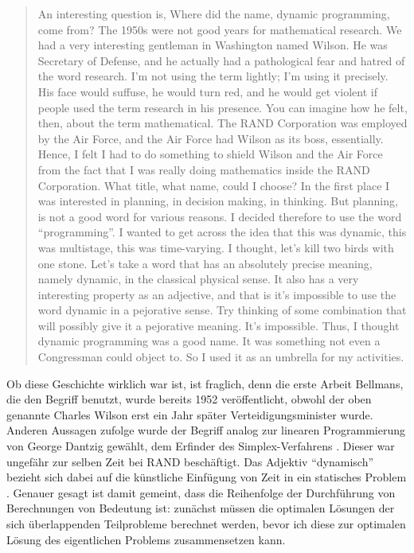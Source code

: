 \begin{quotation}
	An interesting question is, Where did the name, dynamic programming, come from? The 1950s were not good years for mathematical research. We had a very interesting gentleman in Washington named Wilson. He was Secretary of Defense, and he actually had a pathological fear and hatred of the word research. I’m not using the term lightly; I’m using it precisely. His face would suffuse, he would turn red, and he would get violent if people used the term research in his presence. You can imagine how he felt, then, about the term mathematical. The RAND Corporation was employed by the Air Force, and the Air Force had Wilson as its boss, essentially. Hence, I felt I had to do something to shield Wilson and the Air Force from the fact that I was really doing mathematics inside the RAND Corporation. What title, what name, could I choose? In the first place I was interested in planning, in decision making, in thinking. But planning, is not a good word for various reasons. I decided therefore to use the word “programming”. I wanted to get across the idea that this was dynamic, this was multistage, this was time-varying. I thought, let's kill two birds with one stone. Let's take a word that has an absolutely precise meaning, namely dynamic, in the classical physical sense. It also has a very interesting property as an adjective, and that is it's impossible to use the word dynamic in a pejorative sense. Try thinking of some combination that will possibly give it a pejorative meaning. It's impossible. Thus, I thought dynamic programming was a good name. It was something not even a Congressman could object to. So I used it as an umbrella for my activities.
\end{quotation}

Ob diese Geschichte wirklich war ist, ist fraglich, denn die erste Arbeit Bellmans, die den Begriff benutzt, wurde bereits 1952 veröffentlicht, obwohl der oben genannte Charles Wilson erst ein Jahr später Verteidigungsminister wurde. Anderen Aussagen zufolge wurde der Begriff analog zur linearen Programmierung von George Dantzig gewählt, dem Erfinder des Simplex-Verfahrens \citep{rn09}. Dieser war ungefähr zur selben Zeit bei RAND beschäftigt. Das Adjektiv \enquote{dynamisch} bezieht sich dabei auf die künstliche Einfügung von Zeit in ein statisches Problem \citep{b57}. Genauer gesagt ist damit gemeint, dass die Reihenfolge der Durchführung von Berechnungen von Bedeutung ist: zunächst müssen die optimalen Lösungen der sich überlappenden Teilprobleme berechnet werden, bevor ich diese zur optimalen Lösung des eigentlichen Problems zusammensetzen kann.

